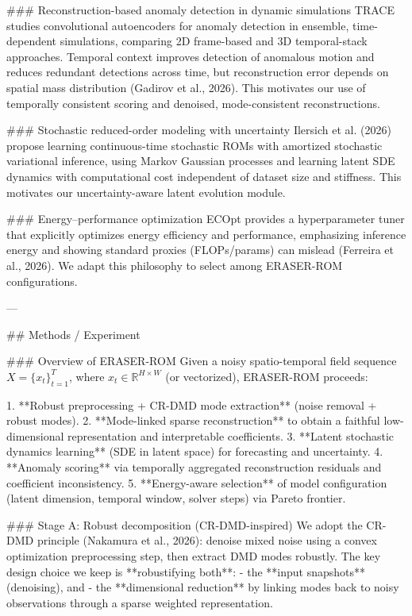 ### Reconstruction-based anomaly detection in dynamic simulations  
TRACE studies convolutional autoencoders for anomaly detection in ensemble, time-dependent simulations, comparing 2D frame-based and 3D temporal-stack approaches. Temporal context improves detection of anomalous motion and reduces redundant detections across time, but reconstruction error depends on spatial mass distribution (Gadirov et al., 2026). This motivates our use of temporally consistent scoring and denoised, mode-consistent reconstructions.

### Stochastic reduced-order modeling with uncertainty  
Ilersich et al. (2026) propose learning continuous-time stochastic ROMs with amortized stochastic variational inference, using Markov Gaussian processes and learning latent SDE dynamics with computational cost independent of dataset size and stiffness. This motivates our uncertainty-aware latent evolution module.

### Energy–performance optimization  
ECOpt provides a hyperparameter tuner that explicitly optimizes energy efficiency and performance, emphasizing inference energy and showing standard proxies (FLOPs/params) can mislead (Ferreira et al., 2026). We adapt this philosophy to select among ERASER-ROM configurations.

---

## Methods / Experiment  

### Overview of ERASER-ROM  
Given a noisy spatio-temporal field sequence \(X = \{x_t\}_{t=1}^T\), where \(x_t \in \mathbb{R}^{H\times W}\) (or vectorized), ERASER-ROM proceeds:

1. **Robust preprocessing + CR-DMD mode extraction** (noise removal + robust modes).  
2. **Mode-linked sparse reconstruction** to obtain a faithful low-dimensional representation and interpretable coefficients.  
3. **Latent stochastic dynamics learning** (SDE in latent space) for forecasting and uncertainty.  
4. **Anomaly scoring** via temporally aggregated reconstruction residuals and coefficient inconsistency.  
5. **Energy-aware selection** of model configuration (latent dimension, temporal window, solver steps) via Pareto frontier.

### Stage A: Robust decomposition (CR-DMD-inspired)  
We adopt the CR-DMD principle (Nakamura et al., 2026): denoise mixed noise using a convex optimization preprocessing step, then extract DMD modes robustly. The key design choice we keep is **robustifying both**:
- the **input snapshots** (denoising), and  
- the **dimensional reduction** by linking modes back to noisy observations through a sparse weighted representation.

